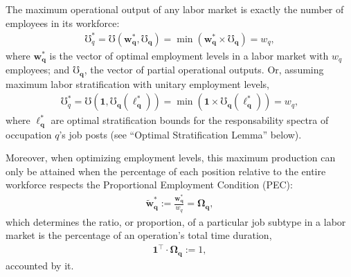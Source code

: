 \documentclass[hidelinks, nonatbib]{elsarticle}
\begin{document}
\begin{lemma}
    The maximum operational output of any labor market is exactly the number of employees in its workforce:
    \begin{gather}
        \mho_{q}^{*}
        =
        \mho(
            \boldsymbol{w_{q}^{*}},
            \boldsymbol{\mho_q}
        )
        = 
        \min(
            \boldsymbol{w_{q}^{*}}
            \times
            \boldsymbol{\mho_q}
        )
        = w_q
        ,
    \end{gather}
    where $\boldsymbol{w_{q}^{*}}$ is the vector of optimal employment levels in a labor market with $w_q$ employees; and $\boldsymbol{\mho_q}$, the vector of partial operational outputs. Or, assuming maximum labor stratification with unitary employment levels,
    \begin{gather}
        \mho_{q}^{*}
        =
        \mho(
            \boldsymbol{1},
            \boldsymbol{\mho_q}(
                \boldsymbol{\ell_{q}^{*}}
            )
        )
        =
        \min(
            \boldsymbol{1}
            \times
            \boldsymbol{\mho_q}(
                \boldsymbol{\ell_{q}^{*}}
            )
        )
        = w_q
        ,
    \end{gather}
    where $\boldsymbol{\ell_{q}^{*}}$ are optimal stratification bounds for the responsability spectra of occupation $q$'s job posts (see ``Optimal Stratification Lemma'' below).
    
    Moreover, when optimizing employment levels, this maximum production can only be attained when the percentage of each position relative to the entire workforce respects the Proportional Employment Condition (PEC):
    \begin{gather}
        \boldsymbol{\tilde{w}_{q}^{*}}
        :=
        \frac{
            \boldsymbol{w_{q}^{*}}
        }{
            w_q
        }
        =
        \boldsymbol{\Omega_{q}}
        ,
    \end{gather}
    which determines the ratio, or proportion, of a particular job subtype in a labor market is the percentage of an operation's total time duration,
    \begin{gather}
        \boldsymbol{1} ^ {\top}
        \cdot
        \boldsymbol{\Omega_{q}}
        := 1
        ,
    \end{gather}
    accounted by it.
    

\end{lemma}
\end{document}
